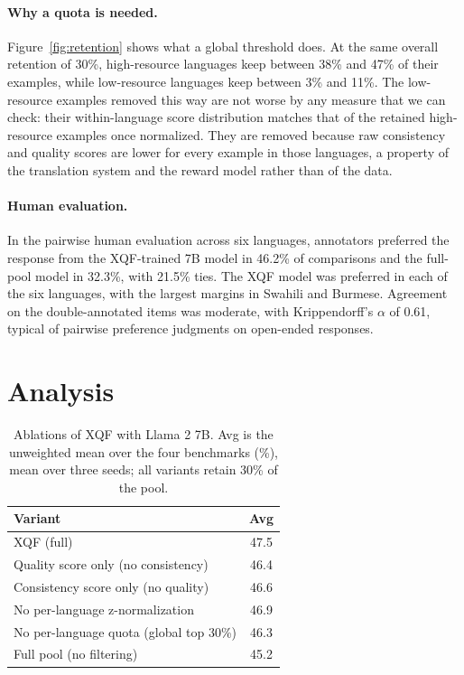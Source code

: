 \documentclass{article}
\begin{document}
\paragraph{Why a quota is needed.}
Figure~\ref{fig:retention} shows what a global threshold does. At the same overall retention of 30\%, high-resource languages keep between 38\% and 47\% of their examples, while low-resource languages keep between 3\% and 11\%. The low-resource examples removed this way are not worse by any measure that we can check: their within-language score distribution matches that of the retained high-resource examples once normalized. They are removed because raw consistency and quality scores are lower for every example in those languages, a property of the translation system and the reward model rather than of the data.

\paragraph{Human evaluation.}
In the pairwise human evaluation across six languages, annotators preferred the response from the XQF-trained 7B model in 46.2\% of comparisons and the full-pool model in 32.3\%, with 21.5\% ties. The XQF model was preferred in each of the six languages, with the largest margins in Swahili and Burmese. Agreement on the double-annotated items was moderate, with Krippendorff's $\alpha$ \citep{krippendorff2004content} of 0.61, typical of pairwise preference judgments on open-ended responses.

\section{Analysis}
\label{sec:analysis}

\begin{table}[t]
\centering
\caption{Ablations of XQF with Llama 2 7B. Avg is the unweighted mean over the four benchmarks (\%), mean over three seeds; all variants retain 30\% of the pool.}
\label{tab:ablation}
\small
\begin{tabular}{lc}
\toprule
Variant & Avg \\
\midrule
XQF (full) & 47.5 \\
Quality score only (no consistency) & 46.4 \\
Consistency score only (no quality) & 46.6 \\
No per-language z-normalization & 46.9 \\
No per-language quota (global top 30\%) & 46.3 \\
\midrule
Full pool (no filtering) & 45.2 \\
\bottomrule
\end{tabular}
\end{table}
\end{document}
